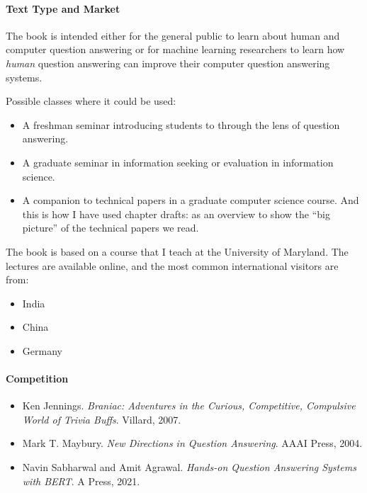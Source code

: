 

\paragraph{Text Type and Market}

The book is intended either for the general public to learn about human and computer
question answering or for machine learning researchers to learn
how \emph{human} question answering can improve their computer question
answering systems.

Possible classes where it could be used:
\begin{itemize}
        \item A freshman seminar introducing students to 
          through the lens of question answering.
        \item A graduate seminar in information seeking or evaluation
          in information science.
        \item A companion to technical papers in a graduate computer
          science course.  And this is how I have used chapter drafts:
          as an overview to show the ``big picture'' of the technical
          papers we read.
\end{itemize}

The book is based on a course that I teach at the University of
Maryland.  The lectures are available online, and the most common
international visitors are from:
\begin{itemize}
\item India
\item China
  \item Germany
\end{itemize}

\paragraph{Competition}

\begin{itemize}
        \item Ken Jennings.  \textit{Braniac: Adventures in the Curious,
        Competitive, Compulsive World of Trivia Buffs}.  Villard, 2007.

        \item Mark T. Maybury.  \textit{New Directions in Question
        Answering}.  AAAI Press, 2004.

        \item Navin Sabharwal and Amit Agrawal.  \textit{Hands-on Question
        Answering Systems with BERT}.  A Press, 2021.
\end{itemize}

